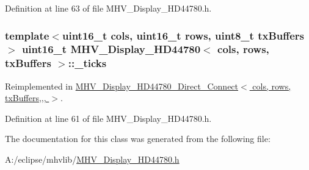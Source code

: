 Definition at line 63 of file M\-H\-V\-\_\-\-Display\-\_\-\-H\-D44780.\-h.

\hypertarget{class_m_h_v___display___h_d44780_a447c8849122f3533367daf1b105cf9c1}{
\subsubsection[{\-\_\-ticks}]{\setlength{\rightskip}{0pt plus 5cm}template$<$uint16\-\_\-t cols, uint16\-\_\-t rows, uint8\-\_\-t tx\-Buffers$>$ uint16\-\_\-t {\bf M\-H\-V\-\_\-\-Display\-\_\-\-H\-D44780}$<$ cols, rows, tx\-Buffers $>$\-::\-\_\-ticks\hspace{0.3cm}{\ttfamily [protected]}}}\label{class_m_h_v___display___h_d44780_a447c8849122f3533367daf1b105cf9c1}


Reimplemented in \hyperlink{class_m_h_v___display___h_d44780___direct___connect_a4e3dea8cf7b70750de11858d52044113}{M\-H\-V\-\_\-\-Display\-\_\-\-H\-D44780\-\_\-\-Direct\-\_\-\-Connect$<$ cols, rows, tx\-Buffers,,, $>$}.



Definition at line 61 of file M\-H\-V\-\_\-\-Display\-\_\-\-H\-D44780.\-h.



The documentation for this class was generated from the following file\-:\begin{DoxyCompactItemize}
\item 
A\-:/eclipse/mhvlib/\hyperlink{_m_h_v___display___h_d44780_8h}{M\-H\-V\-\_\-\-Display\-\_\-\-H\-D44780.\-h}\end{DoxyCompactItemize}
